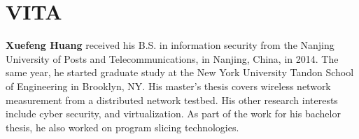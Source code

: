 \chapter*{VITA}
\textbf{Xuefeng Huang} received his B.S. in information security from the Nanjing University of Posts and Telecommunications, in Nanjing, China, in 2014. The same year, he started graduate study at the New York University Tandon School of Engineering in Brooklyn, NY. His master’s thesis covers wireless network measurement from a distributed network testbed. His other research interests include cyber security, and virtualization. As part of the work for his bachelor thesis, he also worked on program slicing technologies.